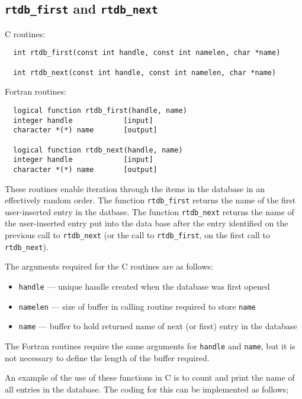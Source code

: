 \subsection{{\tt rtdb\_first} and {\tt rtdb\_next}}

C routines:

\begin{verbatim}
  int rtdb_first(const int handle, const int namelen, char *name)

  int rtdb_next(const int handle, const int namelen, char *name)
\end{verbatim}


Fortran routines:

\begin{verbatim}
  logical function rtdb_first(handle, name)
  integer handle            [input]
  character *(*) name       [output]

  logical function rtdb_next(handle, name)
  integer handle            [input]
  character *(*) name       [output]
\end{verbatim}
These routines enable iteration through the items in the database in
an effectively random order.  The function {\tt rtdb\_first} returns
the name of the first user-inserted entry in the datbase.  The function
{\tt rtdb\_next} returns the name of the user-inserted entry put into the
data base after the entry identified on the previous call to {\tt rtdb\_next}
(or the call to {\tt rtdb\_first}, on the first call to {\tt rtdb\_next}).

The arguments required for the C routines are as follows:

\begin{itemize}

\item {\tt handle} --- unique handle created when the database was first opened
\item {\tt namelen} ---  size of buffer in calling routine required to store {\tt name}
\item {\tt name} --- buffer to hold returned name of next (or first) entry in the database 
\end{itemize}

The Fortran routines require the same arguments for {\tt handle} and {\tt name}, but it is 
not necessary to define the length of the buffer required.

An example of the use of these functions in C is to count and print the name of all
entries  in the database.  The coding for this can be implemented as follows;

